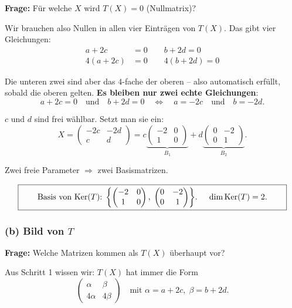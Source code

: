 \documentclass[a4paper,12pt]{article}
\begin{document}
\textbf{Frage:} F\"ur welche $X$ wird $T(X) = 0$ (Nullmatrix)?

Wir brauchen also Nullen in allen vier Eintr\"agen von $T(X)$. Das gibt vier Gleichungen:
\begin{align*}
a + 2c &= 0 \qquad b + 2d = 0 \\
4(a+2c) &= 0 \qquad 4(b+2d) = 0
\end{align*}

Die unteren zwei sind aber das $4$-fache der oberen -- also automatisch erf\"ullt, sobald die oberen gelten. \textbf{Es bleiben nur zwei echte Gleichungen}:
\[
a + 2c = 0 \quad\text{und}\quad b + 2d = 0
\quad\Longleftrightarrow\quad
a = -2c \quad\text{und}\quad b = -2d.
\]

$c$ und $d$ sind frei w\"ahlbar. Setzt man sie ein:
\[
X = \begin{pmatrix} -2c & -2d \\ c & d \end{pmatrix}
= c \underbrace{\begin{pmatrix} -2 & 0 \\ 1 & 0 \end{pmatrix}}_{B_1}
+ d \underbrace{\begin{pmatrix} 0 & -2 \\ 0 & 1 \end{pmatrix}}_{B_2}.
\]

Zwei freie Parameter $\Rightarrow$ zwei Basismatrizen.

\[
\fbox{\parbox{0.93\textwidth}{\centering
Basis von $\text{Ker}(T)$: $\left\{\begin{pmatrix} -2 & 0 \\ 1 & 0 \end{pmatrix},\; \begin{pmatrix} 0 & -2 \\ 0 & 1 \end{pmatrix}\right\}$. \quad $\dim \text{Ker}(T) = 2$.
}}
\]

\subsubsection*{(b) Bild von $T$}

\textbf{Frage:} Welche Matrizen kommen als $T(X)$ \"uberhaupt vor?

Aus Schritt 1 wissen wir: $T(X)$ hat immer die Form
\[
\begin{pmatrix} \alpha & \beta \\ 4\alpha & 4\beta \end{pmatrix}
\quad\text{mit } \alpha = a + 2c,\; \beta = b + 2d.
\]
\end{document}
